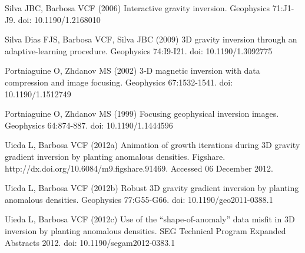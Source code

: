 \documentclass[twocolumn,final]{svjour3}
\begin{document}
\begin{thebibliography}{}
Silva JBC, Barbosa VCF (2006)
Interactive gravity inversion. Geophysics 71:J1-J9. doi: 10.1190/1.2168010

Silva Dias FJS, Barbosa VCF, Silva JBC (2009)
3D gravity inversion through an adaptive-learning procedure.
Geophysics 74:I9-I21. doi: 10.1190/1.3092775

Portniaguine O, Zhdanov MS (2002)
3‐D magnetic inversion with data compression and image focusing.
Geophysics 67:1532-1541. doi: 10.1190/1.1512749

Portniaguine O, Zhdanov MS (1999)
Focusing geophysical inversion images. Geophysics 64:874-887.
doi: 10.1190/1.1444596

Uieda L, Barbosa VCF (2012a)
Animation of growth iterations during 3D gravity gradient inversion by planting
anomalous densities. Figshare. http://dx.doi.org/10.6084/m9.figshare.91469.
Accessed 06 December 2012.

Uieda L, Barbosa VCF (2012b)
Robust 3D gravity gradient inversion by planting anomalous densities.
Geophysics 77:G55-G66. doi: 10.1190/geo2011-0388.1

Uieda L, Barbosa VCF (2012c)
Use of the ``shape-of-anomaly'' data misfit in 3D inversion by planting
anomalous densities. SEG Technical Program Expanded Abstracts 2012.
doi: 10.1190/segam2012-0383.1

\end{thebibliography}
\end{document}
